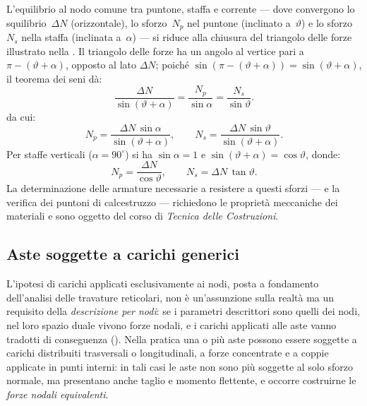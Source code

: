 L'equilibrio al nodo comune tra puntone, staffa e
corrente --- dove convergono lo squilibrio~$\Delta N$
(orizzontale), lo sforzo~$N_p$ nel puntone
(inclinato a~$\vartheta$) e lo sforzo~$N_s$ nella
staffa (inclinata a~$\alpha$) --- si riduce alla
chiusura del triangolo delle forze illustrato nella
. 
Il triangolo delle forze ha un angolo al vertice
pari a $\pi - (\vartheta+\alpha)$, opposto al lato
$\Delta N$; poiché $\sin(\pi-(\vartheta+\alpha))
= \sin(\vartheta+\alpha)$, il teorema dei seni dà:
\begin{equation}\label{eq:triangolo_forze}
	\frac{\Delta N}{\sin(\vartheta+\alpha)}
	= \frac{N_p}{\sin\alpha}
	= \frac{N_s}{\sin\vartheta}.
\end{equation}
da cui:
\begin{equation}\label{eq:Np_Ns}
	N_p = \frac{\Delta N\,\sin\alpha}{\sin(\vartheta+\alpha)},
	\qquad
	N_s = \frac{\Delta N\,\sin\vartheta}{\sin(\vartheta+\alpha)}.
\end{equation}
Per staffe verticali ($\alpha = 90^\circ$) si ha
$\sin\alpha = 1$ e $\sin(\vartheta+\alpha) = \cos\vartheta$,
donde:
\begin{equation}\label{eq:Np_Ns_vert}
	N_p = \frac{\Delta N}{\cos\vartheta},
	\qquad
	N_s = \Delta N\,\tan\vartheta.
\end{equation}
La determinazione delle armature necessarie a
resistere a questi sforzi --- e la verifica dei
puntoni di calcestruzzo --- richiedono le proprietà
meccaniche dei materiali e sono oggetto del corso
di \emph{Tecnica delle Costruzioni}.






\subsection{Aste soggette a carichi generici}
\label{sec:aste_caricate_trasv}

L'ipotesi di carichi applicati esclusivamente ai nodi,
posta a fondamento dell'analisi delle travature
reticolari, non è un'assunzione sulla realtà ma un
requisito della \emph{descrizione per nodi}: se i
parametri descrittori sono quelli dei nodi, nel loro
spazio duale vivono forze nodali, e i carichi applicati
alle aste vanno tradotti di conseguenza
(). Nella pratica una
o più aste possono essere soggette a carichi distribuiti
trasversali o longitudinali, a forze concentrate e a
coppie applicate in punti interni: in tali casi le aste
non sono più soggette al solo sforzo normale, ma
presentano anche taglio e momento flettente, e occorre
costruirne le \emph{forze nodali equivalenti}.

